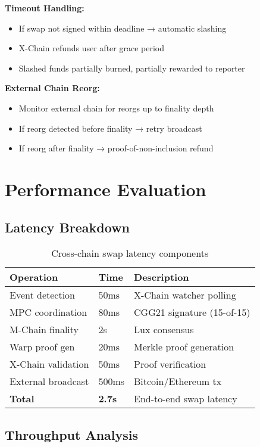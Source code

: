\documentclass[11pt]{article}
\begin{document}
\textbf{Timeout Handling:}
\begin{itemize}
\item If swap not signed within deadline → automatic slashing
\item X-Chain refunds user after grace period
\item Slashed funds partially burned, partially rewarded to reporter
\end{itemize}

\textbf{External Chain Reorg:}
\begin{itemize}
\item Monitor external chain for reorgs up to finality depth
\item If reorg detected before finality → retry broadcast
\item If reorg after finality → proof-of-non-inclusion refund
\end{itemize}

\section{Performance Evaluation}

\subsection{Latency Breakdown}

\begin{table}[h]
\centering
\begin{tabular}{@{}lll@{}}
\toprule
\textbf{Operation} & \textbf{Time} & \textbf{Description} \\
\midrule
Event detection & 50ms & X-Chain watcher polling \\
MPC coordination & 80ms & CGG21 signature (15-of-15) \\
M-Chain finality & 2s & Lux consensus \\
Warp proof gen & 20ms & Merkle proof generation \\
X-Chain validation & 50ms & Proof verification \\
External broadcast & 500ms & Bitcoin/Ethereum tx \\
\midrule
\textbf{Total} & \textbf{2.7s} & End-to-end swap latency \\
\bottomrule
\end{tabular}
\caption{Cross-chain swap latency components}
\label{tab:latency}
\end{table}

\subsection{Throughput Analysis}
\end{document}

